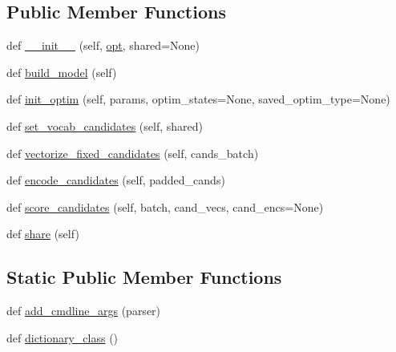 \subsection*{Public Member Functions}
\begin{DoxyCompactItemize}
\item 
def \hyperlink{classparlai_1_1agents_1_1bert__ranker_1_1bi__encoder__ranker_1_1BiEncoderRankerAgent_a353144d4f4c3182774913c4ddba33de9}{\+\_\+\+\_\+init\+\_\+\+\_\+} (self, \hyperlink{classparlai_1_1core_1_1torch__agent_1_1TorchAgent_a785bb920cf8c8afc3e9bf6a8b77e335a}{opt}, shared=None)
\item 
def \hyperlink{classparlai_1_1agents_1_1bert__ranker_1_1bi__encoder__ranker_1_1BiEncoderRankerAgent_a120946c26655cbb680f1e492cf4e4817}{build\+\_\+model} (self)
\item 
def \hyperlink{classparlai_1_1agents_1_1bert__ranker_1_1bi__encoder__ranker_1_1BiEncoderRankerAgent_a14ad454025e3db96b5f34e1270e44254}{init\+\_\+optim} (self, params, optim\+\_\+states=None, saved\+\_\+optim\+\_\+type=None)
\item 
def \hyperlink{classparlai_1_1agents_1_1bert__ranker_1_1bi__encoder__ranker_1_1BiEncoderRankerAgent_acdfa23a21c8364e7205093a5af51264f}{set\+\_\+vocab\+\_\+candidates} (self, shared)
\item 
def \hyperlink{classparlai_1_1agents_1_1bert__ranker_1_1bi__encoder__ranker_1_1BiEncoderRankerAgent_a3062adbae2449553b4a6e12c5973116d}{vectorize\+\_\+fixed\+\_\+candidates} (self, cands\+\_\+batch)
\item 
def \hyperlink{classparlai_1_1agents_1_1bert__ranker_1_1bi__encoder__ranker_1_1BiEncoderRankerAgent_a98361c5172041c64dc2da76ab9b654a7}{encode\+\_\+candidates} (self, padded\+\_\+cands)
\item 
def \hyperlink{classparlai_1_1agents_1_1bert__ranker_1_1bi__encoder__ranker_1_1BiEncoderRankerAgent_ac8141b70cff9c26b945d112ad53b035c}{score\+\_\+candidates} (self, batch, cand\+\_\+vecs, cand\+\_\+encs=None)
\item 
def \hyperlink{classparlai_1_1agents_1_1bert__ranker_1_1bi__encoder__ranker_1_1BiEncoderRankerAgent_afbc986c30ae8857d8d4e505a1884b280}{share} (self)
\end{DoxyCompactItemize}
\subsection*{Static Public Member Functions}
\begin{DoxyCompactItemize}
\item 
def \hyperlink{classparlai_1_1agents_1_1bert__ranker_1_1bi__encoder__ranker_1_1BiEncoderRankerAgent_a94b0668eadb20cdd95bd5f95641fc2a6}{add\+\_\+cmdline\+\_\+args} (parser)
\item 
def \hyperlink{classparlai_1_1agents_1_1bert__ranker_1_1bi__encoder__ranker_1_1BiEncoderRankerAgent_a7920edd41a6bdbd18e9a0c50a1953f9d}{dictionary\+\_\+class} ()
\end{DoxyCompactItemize}

